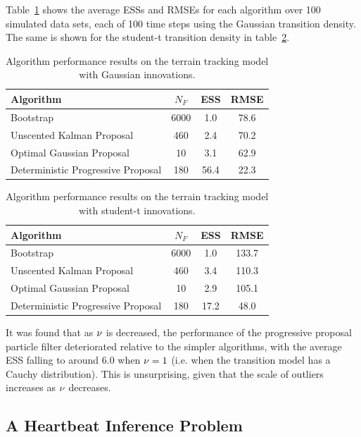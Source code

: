 \documentclass{article}
\begin{document}
Table~\ref{tab:drone_results_gaussian} shows the average ESSs and RMSEs for each algorithm over 100 simulated data sets, each of 100 time steps using the Gaussian transition density. The same is shown for the student-t transition density in table~\ref{tab:drone_results_studentt}.
%
\begin{table}
\centering
\begin{tabular}{l||c|c|c}
Algorithm                                & $N_F$ & ESS  & RMSE \\
\hline
Bootstrap                                &  6000 &  1.0 & 78.6 \\
Unscented Kalman Proposal                &   460 &  2.4 & 70.2 \\
Optimal Gaussian Proposal                &    10 &  3.1 & 62.9 \\
Deterministic Progressive Proposal         &   180 & 56.4 & 22.3 \\
\end{tabular}
\caption{Algorithm performance results on the terrain tracking model with Gaussian innovations.}
\label{tab:drone_results_gaussian}
\end{table}
%
\begin{table}
\centering
\begin{tabular}{l||c|c|c}
Algorithm                                & $N_F$ & ESS  & RMSE \\
\hline
Bootstrap                                &  6000 &  1.0 & 133.7 \\
Unscented Kalman Proposal                &   460 &  3.4 & 110.3 \\
Optimal Gaussian Proposal                &    10 &  2.9 & 105.1 \\
Deterministic Progressive Proposal         &   180 & 17.2 & 48.0 \\
\end{tabular}
\caption{Algorithm performance results on the terrain tracking model with student-t innovations.}
\label{tab:drone_results_studentt}
\end{table}

It was found that as $\nu$ is decreased, the performance of the progressive proposal particle filter deteriorated relative to the simpler algorithms, with the average ESS falling to around $6.0$ when $\nu=1$ (i.e. when the transition model has a Cauchy distribution). This is unsurprising, given that the scale of outliers increases as $\nu$ decreases.



\subsection{A Heartbeat Inference Problem}
\end{document}
